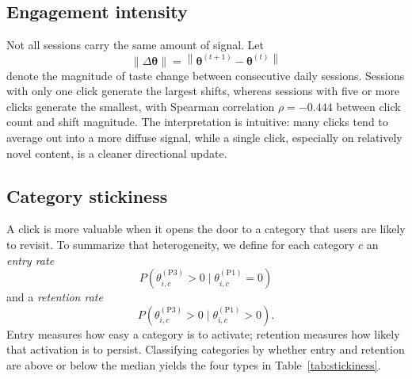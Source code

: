 \documentclass[11pt]{article}
\begin{document}
\subsection{Engagement intensity}

Not all sessions carry the same amount of signal. Let
\[
\|\Delta\boldsymbol{\theta}\|
=
\left\|
\boldsymbol{\theta}^{(t+1)}-\boldsymbol{\theta}^{(t)}
\right\|
\]
denote the magnitude of taste change between consecutive daily sessions. Sessions with only one click generate the largest shifts, whereas sessions with five or more clicks generate the smallest, with Spearman correlation $\rho=-0.444$ between click count and shift magnitude. The interpretation is intuitive: many clicks tend to average out into a more diffuse signal, while a single click, especially on relatively novel content, is a cleaner directional update.

\subsection{Category stickiness}

A click is more valuable when it opens the door to a category that users are likely to revisit. To summarize that heterogeneity, we define for each category $c$ an \emph{entry rate}
\[
P\!\left(\theta_{i,c}^{(\mathrm{P3})}>0 \mid \theta_{i,c}^{(\mathrm{P1})}=0\right)
\]
and a \emph{retention rate}
\[
P\!\left(\theta_{i,c}^{(\mathrm{P3})}>0 \mid \theta_{i,c}^{(\mathrm{P1})}>0\right).
\]
Entry measures how easy a category is to activate; retention measures how likely that activation is to persist. Classifying categories by whether entry and retention are above or below the median yields the four types in Table~\ref{tab:stickiness}.
\end{document}
